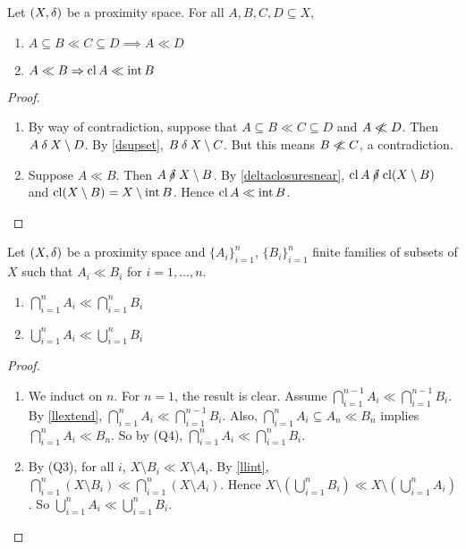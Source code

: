 \begin{proposition}
	Let \( (X,\mathord{\delta}) \) be a proximity space.  For all \( A,B,C,D \subseteq X \),
	\begin{enumerate}[label={(\arabic*)},ref={\theproposition(\arabic*)}]
		\item \label{llextend}
			\( A \subseteq B \ll C \subseteq D \implies A \ll D \)
		\item \label{llclint}
			\( A \ll B \Rightarrow \operatorname{cl}{A} \ll \operatorname{int}{B} \)
	\end{enumerate}
\end{proposition}
\begin{proof}
	\leavevmode
	\begin{enumerate}
		\item By way of contradiction, suppose that \( A \subseteq B \ll C \subseteq D \) and \( A \nll D \).  Then \( A \mathbin{\delta} X \setminus D \).  By \ref{dsupset}, \( B \mathbin{\delta} X \setminus C \).  But this means \( B \nll C \), a contradiction.
		\item Suppose \( A \ll B \).  Then \( A \nnear X \setminus B \).  By \ref{deltaclosuresnear}, \( \cl{A} \nnear \cl(X \setminus B) \) and \( \operatorname{cl}(X \setminus B) = X \setminus \operatorname{int}{B} \).  Hence \( \operatorname{cl}{A} \ll \operatorname{int}{B} \).	\end{enumerate}
\end{proof}

\begin{proposition}
	\label{llintun}
	Let \( (X, \mathord{\delta}) \) be a proximity space and \( \{ A_i \}_{i=1}^n \), \( \{ B_i \}_{i=1}^n \) finite families of subsets of \( X \) such that \( A_i \ll B_i \) for \( i=1, \dots, n \).
	\begin{enumerate}[label={(\arabic*)},ref={\theproposition(\arabic*)}]
		\item \label{llint}
			\( \bigcap_{i=1}^n A_i \ll \bigcap_{i=1}^n B_i \)
		\item \label{llun}
			\( \bigcup_{i=1}^n A_i \ll \bigcup_{i=1}^n B_i \)
	\end{enumerate}
\end{proposition}
\begin{proof}
	\leavevmode
	\begin{enumerate}
		\item We induct on \( n \).  For \( n = 1 \), the result is clear.  Assume \( \bigcap_{i=1}^{n-1} A_i \ll \bigcap_{i=1}^{n-1} B_i \).  By \ref{llextend}, \( \bigcap_{i=1}^n A_i \ll \bigcap_{i=1}^{n-1} B_i \).  Also, \( \bigcap_{i=1}^n A_i \subseteq A_n \ll B_n \) implies \( \bigcap_{i=1}^n A_i \ll B_n \).  So by (Q4), \( \bigcap_{i=1}^n A_i \ll \bigcap_{i=1}^n B_i \).
		\item By (Q3), for all \( i \), \( X \setminus B_i \ll X \setminus A_i \).  By \ref{llint}, \( \bigcap_{i=1}^n (X \setminus B_i) \ll \bigcap_{i=1}^n (X \setminus A_i) \).  Hence \( X \setminus ( \bigcup_{i=1}^n B_i ) \ll X \setminus ( \bigcup_{i=1}^n A_i ) \).  So \( \bigcup_{i=1}^n A_i \ll \bigcup_{i=1}^n B_i \).
	\end{enumerate}
\end{proof}


